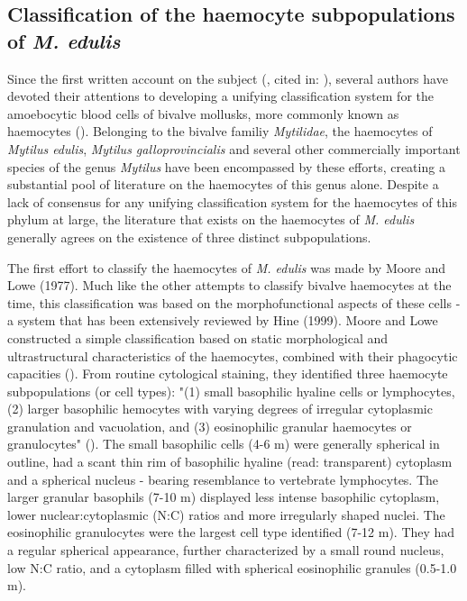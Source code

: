 \subsection{Classification of the haemocyte subpopulations of \emph{M. edulis}}
\label{subsection:haemocyte_classification}
Since the first written account on the subject (\cite{Cuenot1891}, cited in: \cite{Cheng1980}), several authors have devoted their attentions to developing a unifying classification system for the amoebocytic blood cells of bivalve mollusks, more commonly known as haemocytes (\cite{Cheng1980, delaBallina2022}). Belonging to the bivalve familiy \emph{Mytilidae}, the haemocytes of \emph{Mytilus edulis}, \emph{Mytilus galloprovincialis} and several other commercially important species of the genus \emph{Mytilus} have been encompassed by these efforts, creating a substantial pool of literature on the haemocytes of this genus alone. Despite a lack of consensus for any unifying classification system for the haemocytes of this phylum at large, the literature that exists on the haemocytes of \emph{M. edulis} generally agrees on the existence of three distinct subpopulations.

The first effort to classify the haemocytes of \emph{M. edulis} was made by Moore and Lowe (1977). Much like the other attempts to classify bivalve haemocytes at the time, this classification was based on the morphofunctional aspects of these cells - a system that has been extensively reviewed by Hine (1999). Moore and Lowe constructed a simple classification based on static morphological and ultrastructural characteristics of the haemocytes, combined with their phagocytic capacities (\cite{Moore1977}). From routine cytological staining, they identified three haemocyte subpopulations (or cell types): "(1) small basophilic hyaline cells or lymphocytes, (2) larger basophilic hemocytes with varying degrees of irregular cytoplasmic granulation and vacuolation, and (3) eosinophilic granular haemocytes or granulocytes" (\cite{Moore1977}). The small basophilic cells (4-6 \micro m) were generally spherical in outline, had a scant thin rim of basophilic hyaline (read: transparent) cytoplasm and a spherical nucleus - bearing resemblance to vertebrate lymphocytes. The larger granular basophils (7-10 \micro m) displayed less intense basophilic cytoplasm, lower nuclear:cytoplasmic (N:C) ratios and more irregularly shaped nuclei. The eosinophilic granulocytes were the largest cell type identified (7-12 \micro m). They had a regular spherical appearance, further characterized by a small round nucleus, low N:C ratio, and a cytoplasm filled with spherical eosinophilic granules (0.5-1.0 \micro m).

